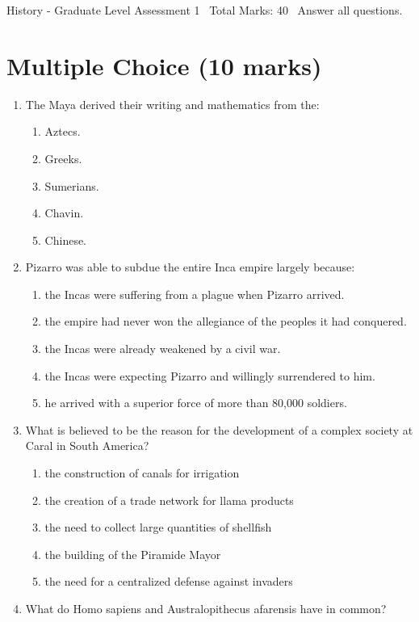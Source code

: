 \documentclass[12pt]{article}
\begin{document}
\begin{center}
History - Graduate Level Assessment 1 \
Total Marks: 40 \
Answer all questions.
\end{center}

\section*{Multiple Choice (10 marks)}
\begin{enumerate}[label=\arabic*.]
\item The Maya derived their writing and mathematics from the:
\begin{enumerate}[label=(\alph*)]
    \item Aztecs.
    \item Greeks.
    \item Sumerians.
    \item Chavin.
    \item Chinese.
\end{enumerate}
\item Pizarro was able to subdue the entire Inca empire largely because:
\begin{enumerate}[label=(\alph*)]
    \item the Incas were suffering from a plague when Pizarro arrived.
    \item the empire had never won the allegiance of the peoples it had conquered.
    \item the Incas were already weakened by a civil war.
    \item the Incas were expecting Pizarro and willingly surrendered to him.
    \item he arrived with a superior force of more than 80,000 soldiers.
\end{enumerate}
\item What is believed to be the reason for the development of a complex society at Caral in South America?
\begin{enumerate}[label=(\alph*)]
    \item the construction of canals for irrigation
    \item the creation of a trade network for llama products
    \item the need to collect large quantities of shellfish
    \item the building of the Piramide Mayor
    \item the need for a centralized defense against invaders
\end{enumerate}
\item What do Homo sapiens and Australopithecus afarensis have in common?

\end{enumerate}
\end{document}
